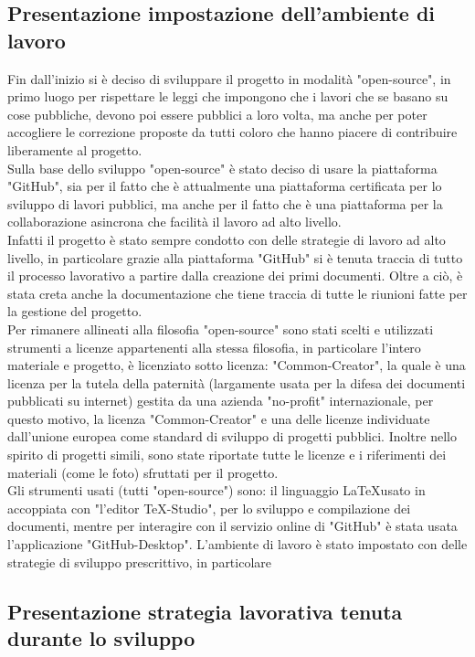 \documentclass[hidelinks,12pt,a4paper]{article}
\begin{document}
\begin{flushleft}
			\subsection{Presentazione impostazione dell'ambiente di lavoro}
			Fin dall'inizio si è deciso di sviluppare il progetto in modalità "open-source", in primo luogo per rispettare le leggi che impongono che i lavori che se basano su cose pubbliche, devono poi essere pubblici a loro volta, ma anche per poter accogliere le correzione proposte da tutti coloro che hanno piacere di contribuire liberamente al progetto.\\
			Sulla base dello sviluppo "open-source" è stato deciso di usare la piattaforma "GitHub", sia per il fatto che è attualmente una piattaforma certificata per lo sviluppo di lavori pubblici, ma anche per il fatto che è una piattaforma per la collaborazione asincrona che facilità il lavoro ad alto livello.\\
			Infatti il progetto è stato sempre condotto con delle strategie di lavoro ad alto livello, in particolare grazie alla piattaforma "GitHub" si è tenuta traccia di tutto il processo lavorativo a partire dalla creazione dei primi documenti. Oltre a ciò, è stata creta anche la documentazione che tiene traccia di tutte le riunioni fatte per la gestione del progetto.\\
			Per rimanere allineati alla filosofia "open-source" sono stati scelti e utilizzati strumenti a licenze appartenenti alla stessa filosofia, in particolare l'intero materiale e progetto, è licenziato sotto licenza: "Common-Creator", la quale è una licenza per la tutela della paternità (largamente usata per la difesa dei documenti pubblicati su internet) gestita da una azienda "no-profit"  internazionale, per questo motivo, la licenza "Common-Creator" e una delle licenze individuate dall'unione europea come standard di sviluppo di progetti pubblici. Inoltre nello spirito di progetti simili, sono state riportate tutte le licenze e i riferimenti dei materiali (come le foto) sfruttati per il progetto.\\
			Gli strumenti usati (tutti "open-source") sono: il linguaggio \LaTeX usato in accoppiata con "l'editor TeX-Studio", per lo sviluppo e compilazione dei documenti, mentre per interagire con il servizio online di "GitHub" è stata usata l'applicazione "GitHub-Desktop".
			\bigskip
			L'ambiente di lavoro è stato impostato con delle strategie di sviluppo prescrittivo, in particolare  
			
			\subsection{Presentazione strategia lavorativa tenuta durante lo sviluppo}

\end{flushleft}
\end{document}
